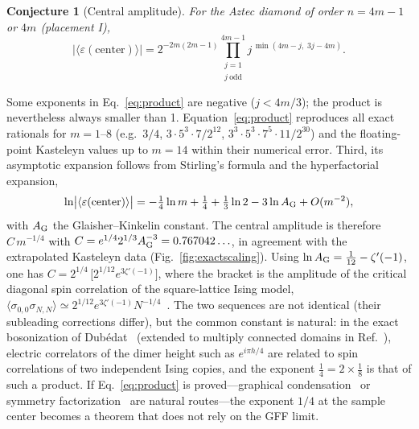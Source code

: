 \documentclass[aps,prb,twocolumn,floatfix,longbibliography]{revtex4-2}
\newtheorem{conjecture}{Conjecture}
\newcommand{\eps}{\varepsilon}
\begin{document}
\begin{conjecture}[Central amplitude]
For the Aztec diamond of order $n=4m-1$ or $4m$ (placement I),
\begin{equation}
\bigl|\langle\eps(\text{center})\rangle\bigr|=2^{-2m(2m-1)}\prod_{\substack{j=1\\ j\ \text{odd}}}^{4m-1} j^{\,\min(4m-j,\;3j-4m)} .
\label{eq:product}
\end{equation}
\end{conjecture}

Some exponents in Eq.~\eqref{eq:product} are negative ($j<4m/3$); the product is nevertheless always smaller than 1. Equation~\eqref{eq:product} reproduces all exact rationals for $m=1$--8 (e.g.\ $3/4$, $3\cdot5^3\cdot7/2^{12}$, $3^3\cdot5^3\cdot7^5\cdot11/2^{30}$) and the floating-point Kasteleyn values up to $m=14$ within their numerical error. Third, its asymptotic expansion follows from Stirling's formula and the hyperfactorial expansion,
\begin{equation}
\ln\bigl|\langle\eps(\text{center})\rangle\bigr|=-\tfrac14\ln m+\tfrac14+\tfrac13\ln2-3\ln A_{\rm G}+O(m^{-2}),
\label{eq:asym}
\end{equation}
with $A_{\rm G}$ the Glaisher--Kinkelin constant. The central amplitude is therefore $C\,m^{-1/4}$ with $C=e^{1/4}2^{1/3}A_{\rm G}^{-3}=0.767042\ldots$, in agreement with the extrapolated Kasteleyn data (Fig.~\ref{fig:exactscaling}). Using $\ln A_{\rm G}=\tfrac1{12}-\zeta'(-1)$, one has $C=2^{1/4}\,\bigl[2^{1/12}e^{3\zeta'(-1)}\bigr]$, where the bracket is the amplitude of the critical diagonal spin correlation of the square-lattice Ising model, $\langle\sigma_{0,0}\sigma_{N,N}\rangle\simeq2^{1/12}e^{3\zeta'(-1)}N^{-1/4}$~\cite{Forrester2018}. The two sequences are not identical (their subleading corrections differ), but the common constant is natural: in the exact bosonization of Dub\'edat~\cite{Dubedat2011} (extended to multiply connected domains in Ref.~\cite{Bayraktaroglu2025}), electric correlators of the dimer height such as $e^{i\pi h/4}$ are related to spin correlations of two independent Ising copies, and the exponent $\tfrac14=2\times\tfrac18$ is that of such a product. If Eq.~\eqref{eq:product} is proved---graphical condensation~\cite{Kuo2004} or symmetry factorization~\cite{Ciucu1997} are natural routes---the exponent $1/4$ at the sample center becomes a theorem that does not rely on the GFF limit.
\end{document}
